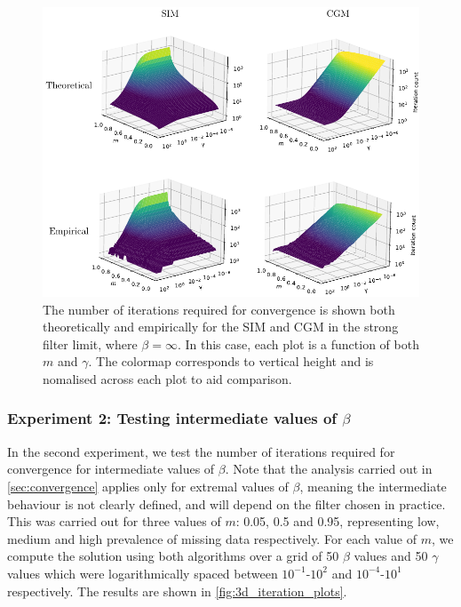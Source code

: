 \begin{figure}[t]
    \begin{center} 
    \includegraphics[width=\linewidth]{Figures/m_gamma_3d_plot.pdf}
    \end{center}
    \caption{\small{The number of iterations required for convergence is shown both theoretically and empirically for the SIM and CGM in the strong filter limit, where $\beta=\infty$. In this case, each plot is a function of both $m$ and $\gamma$. The colormap corresponds to vertical height and is nomalised across each plot to aid comparison. }}
    \label{fig:m_gamma_3d_plot}
\end{figure}


\subsubsection{Experiment 2: Testing intermediate values of \texorpdfstring{$\beta$}{beta}}


In the second experiment, we test the number of iterations required for convergence for intermediate values of $\beta$. Note that the analysis carried out in \cref{sec:convergence} applies only for extremal values of $\beta$, meaning the intermediate behaviour is not clearly defined, and will depend on the filter chosen in practice. This was carried out for three values of $m$: 0.05, 0.5 and 0.95, representing low, medium and high prevalence of missing data respectively. For each value of $m$, we compute the solution using both algorithms over a grid of 50 $\beta$ values and 50 $\gamma$ values which were logarithmically spaced between $10^{-1}$-$10^2$ and $10^{-4}$-$10^1$ respectively. The results are shown in \cref{fig:3d_iteration_plots}. 


